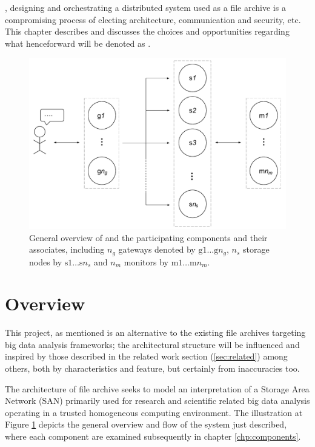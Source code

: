 , designing and orchestrating a distributed system used as a file archive is a compromising process of electing architecture, communication and security, etc. This chapter describes and discusses the choices and opportunities regarding what henceforward will be denoted as \CodeNameFull. 

\begin{figure}
	\centering
	\includegraphics[scale=0.60]{pdf/sofa-overview.pdf}
	\caption[General overview of \CodeName]{General overview of \CodeName and the participating components and their associates, including $n_g$ gateways denoted by $\text{g}1 \ldots \text{g}n_g$, $n_s$ storage nodes by $\text{s}1 \ldots \text{s}n_s$ and $n_m$ monitors by $\text{m}1 \ldots \text{m}n_m$. \label{fig:sofa-overview}}
\end{figure}

\section{Overview}
This project, as mentioned is an alternative to the existing file archives targeting big data analysis frameworks; the architectural structure will be influenced and inspired by those described in the related work section (\ref{sec:related}) among others, both by characteristics and feature, but certainly from inaccuracies too. 
\newline

The architecture of file archive seeks to model an interpretation of a Storage Area Network (SAN) primarily used for research and scientific related big data analysis operating in a trusted homogeneous computing environment. The illustration at Figure \ref{fig:sofa-overview} depicts the general overview and flow of the system just described, where each component are examined subsequently in chapter \ref{chp:components}.

